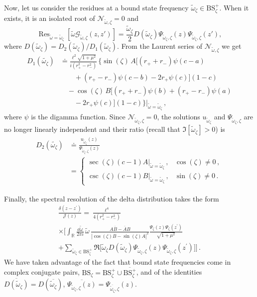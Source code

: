\documentclass[aps, prd, amsmath, floats, floatfix, twocolumn, nofootinbib, superscriptaddress, showpacs]{revtex4-1}
\def\bR{{\mathbb R}}
\def\cG{\mathcal{G}}
\def\cJ{\mathcal{J}}
\def\Res{\operatorname{Res}}
\def\BS{\mathrm{BS}}
\def\tomega{{\tilde{\omega}}}
\begin{document}
Now, let us consider the residues at a bound state frequency $\tomega_\zeta
\in \BS^+_\zeta$. When it exists, it is an isolated root of
$\mathcal{N}_{\tomega,\zeta} = 0$ and
\begin{equation}
\Res_{\tomega=\tomega_\zeta} [\tomega \cG_{\tomega,\zeta}(z,z')]
= \frac{\tomega_\zeta}{2} D(\tomega_\zeta)
\Psi_{\tomega_\zeta,\zeta}(z) \Psi_{\tomega_\zeta,\zeta}(z') ,
\end{equation}
where $D(\tomega_\zeta) = D_2(\tomega_\zeta)/D_1(\tomega_\zeta)$. From the Laurent series
of $\mathcal{N}_{\tomega,\zeta}$ we get
\begin{align*}
D_1(\tilde{\omega_\zeta}) 
&\doteq \frac{\ell^2 \sqrt{1+\mu^2}}{i(r_+^2-r_-^2)}  \, \big\{{\sin(\zeta)}\, A \big[(r_++r_-)\psi(c-a) \\
&\qquad +(r_+-r_-)\psi(c-b)-2r_+\psi(c) \big] (1-c) \\
&\quad - \cos(\zeta)\,B \big[(r_++r_-)\psi(b)+(r_+-r_-)\psi(a) \\
&\qquad -2r_+\psi(c)\big] (1-c)\big\}|_{\tomega=\tomega_\zeta} \, ,
\end{align*}
where $\psi$ is the digamma function. Since
$\mathcal{N}_{\tomega_\zeta,\zeta} = 0$, the solutions $u_{\tomega_\zeta}$ and
$\Psi_{\tomega_\zeta,\zeta}$ are no longer linearly independent and their ratio (recall that $\Im[\tomega_\zeta] > 0$) is
%
\begin{align*}
D_2(\tilde{\omega_\zeta})
&\doteq \frac{u_{\tomega_\zeta}(z)}{\Psi_{{\tomega_\zeta},\zeta}(z)}\\ 
&= \begin{cases}
\sec(\zeta) (c-1) A|_{\tomega=\tomega_{\zeta}}  \, , & \cos(\zeta) \ne 0 \, , \\
\csc(\zeta) (c-1) B|_{\tomega=\tomega_{\zeta}}  \, , & \sin(\zeta) \ne 0 \, .
\end{cases}
\end{align*}
%

Finally, the spectral resolution of the delta distribution takes the form
%
\begin{multline}
	\frac{\delta(z-z^\prime)}{\cJ(z)} 
	= \frac{\ell^4}{4(r_+^2-r_-^2)} 
	\\
	\times \Bigg[ \int_{\bR} \frac{\dd\tilde{\omega}}{2\pi i} \, \tilde{\omega} \, \frac{A\overline{B}-\overline{A}B}{|{\cos(\zeta) B-\sin(\zeta) A}|^2} \frac{\Psi_\zeta(z)\Psi_\zeta(z^\prime)}{\sqrt{1+\mu^2}}
	\\
	+ \sum_{\tomega_{\zeta} \in \BS^+_{\zeta}} \Re\big[ \tilde{\omega}_{\zeta} D(\tilde{\omega}_{\zeta})\Psi_{\tomega_{\zeta},\zeta}(z)\Psi_{\tomega_{\zeta},\zeta}(z^\prime)\big] \Bigg] \, .
\end{multline}
%
We have taken advantage of the fact that bound state
frequencies come in complex conjugate pairs, $\BS_{\zeta} = \BS^+_{\zeta} \cup
\overline{\BS^+_{\zeta}}$, and of the identities $\overline{D(\tomega_{\zeta})} =
D(\overline{\tomega_{\zeta}})$, $\overline{\Psi_{\tomega_{\zeta},\zeta}(z)} =
\Psi_{\overline{\tomega_{\zeta}},\zeta}(z)$.
\end{document}
